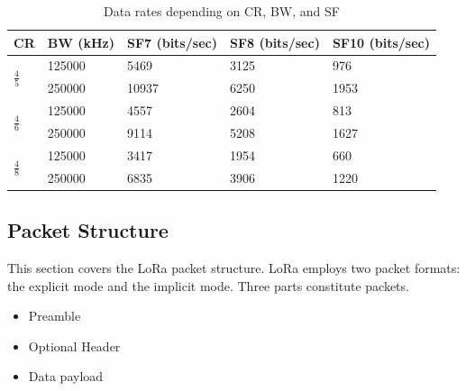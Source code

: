 \begin{table}[h!]
\centering
\begin{tabular}{@{}lllll@{}}
\toprule
CR & BW (kHz) & SF7 (bits/sec) & SF8 (bits/sec) & SF10 (bits/sec) \\ \midrule
\multirow{2}{*}{$\frac{4}{5}$} & 125000   & 5469           & 3125           & 976             \\
  & 250000   & 10937          & 6250           & 1953            \\
\multirow{2}{*}{$\frac{4}{6}$} & 125000   & 4557           & 2604           & 813             \\
  & 250000   & 9114           & 5208           & 1627            \\
\multirow{2}{*}{$\frac{4}{8}$} & 125000   & 3417           & 1954           & 660             \\
  & 250000   & 6835           & 3906           & 1220            \\ \bottomrule
\end{tabular}
\caption{Data rates depending on CR, BW, and SF\label{table:datarate}}
\end{table}

\subsection{Packet Structure}

This section covers the LoRa packet structure. LoRa employs two packet formats: 
the explicit mode and the implicit mode.
Three parts constitute packets.

\begin{itemize}
  \item Preamble
  \item Optional Header
  \item Data payload
\end{itemize}

